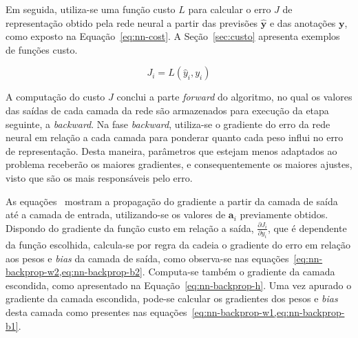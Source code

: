 Em seguida, utiliza-se uma função custo $L$ para calcular o erro $J$ de representação obtido pela rede neural a partir
das previsões $\mathbf{\hat{y}}$ e das anotações $\mathbf{y}$, como exposto na Equação~\ref{eq:nn-cost}.
A Seção~\ref{sec:custo} apresenta exemplos de funções custo.

\begin{equation} \label{eq:nn-cost}
    J_i = L(\hat{y}_i, y_i)
\end{equation}

A computação do custo $J$ conclui a parte \textit{forward} do algoritmo, no qual os valores das saídas de cada camada da
rede são armazenados para execução da etapa seguinte, a \textit{backward}.
Na fase \textit{backward}, utiliza-se o gradiente do erro da rede neural em relação a cada camada para ponderar quanto
cada peso influi no erro de representação.
Desta maneira, parâmetros que estejam menos adaptados ao problema receberão os maiores gradientes, e consequentemente os
maiores ajustes, visto que são os mais responsáveis pelo erro.

As equações~ mostram a propagação do gradiente a partir da camada de
saída até a camada de entrada, utilizando-se os valores de $\mathbf{a}_i$ previamente obtidos.
Dispondo do gradiente da função custo em relação a saída, $\frac{\partial{J_i}}{\partial{y_i}}$, que é dependente da
função escolhida, calcula-se por regra da cadeia o gradiente do erro em relação aos pesos e \textit{bias} da camada de
saída, como observa-se nas equações~\cref{eq:nn-backprop-w2,eq:nn-backprop-b2}.
Computa-se também o gradiente da camada escondida, como apresentado na Equação~\ref{eq:nn-backprop-h}.
Uma vez apurado o gradiente da camada escondida, pode-se calcular os gradientes dos pesos e \textit{bias} desta camada
como presentes nas equações~\cref{eq:nn-backprop-w1,eq:nn-backprop-b1}.

